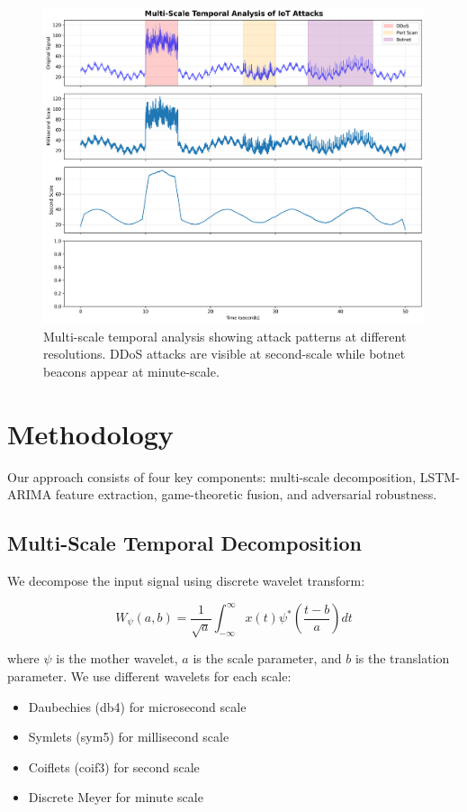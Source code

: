 \documentclass[10pt,conference]{IEEEtran}
\begin{document}
\begin{figure}[!t]
\centering
\includegraphics[width=\columnwidth]{figures/multi_scale_analysis.png}
\caption{Multi-scale temporal analysis showing attack patterns at different resolutions. DDoS attacks are visible at second-scale while botnet beacons appear at minute-scale.}
\label{fig:multiscale}
\end{figure}

\section{Methodology}

Our approach consists of four key components: multi-scale decomposition, LSTM-ARIMA feature extraction, game-theoretic fusion, and adversarial robustness.

\subsection{Multi-Scale Temporal Decomposition}

We decompose the input signal using discrete wavelet transform:

\begin{equation}
W_{\psi}(a,b) = \frac{1}{\sqrt{a}} \int_{-\infty}^{\infty} x(t) \psi^*\left(\frac{t-b}{a}\right) dt
\end{equation}

where $\psi$ is the mother wavelet, $a$ is the scale parameter, and $b$ is the translation parameter. We use different wavelets for each scale:
\begin{itemize}
    \item Daubechies (db4) for microsecond scale
    \item Symlets (sym5) for millisecond scale
    \item Coiflets (coif3) for second scale
    \item Discrete Meyer for minute scale
\end{itemize}
\end{document}
